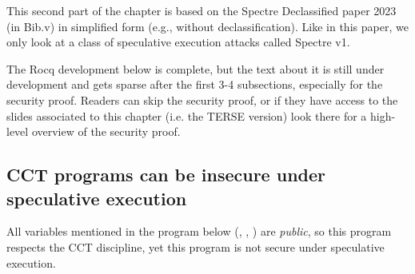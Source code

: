 \documentclass[12pt]{report}
\begin{document}
 This second part of the chapter is based on the Spectre
    Declassified paper    2023 (in Bib.v) in simplified form
    (e.g., without declassification). Like in this paper, we only look
    at a class of speculative execution attacks called Spectre v1. 

 The Rocq development below is complete, but the text about it is still under
    development and gets sparse after the first 3-4 subsections, especially for
    the security proof. Readers can skip the security proof, or if they have
    access to the slides associated to this chapter (i.e. the TERSE version)
    look there for a high-level overview of the security proof. 
\begin{coqdoccode}
\coqdocemptyline
\end{coqdoccode}
\subsection{CCT programs can be insecure under speculative execution}



 All variables mentioned in the program below (, , ) are \textit{public},
    so this program respects the CCT discipline, yet this program is not secure
    under speculative execution. 
\end{document}
